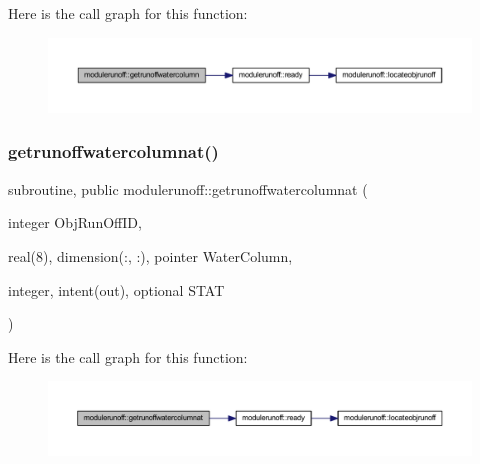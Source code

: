 Here is the call graph for this function\+:
\nopagebreak
\begin{figure}[H]
\begin{center}
\leavevmode
\includegraphics[width=350pt]{namespacemodulerunoff_a2f62616fa000a8f027d3557454de9b24_cgraph}
\end{center}
\end{figure}
\mbox{\label{namespacemodulerunoff_a6f2a352071be64f678c58f0707749d4f}} 
\subsubsection{\texorpdfstring{getrunoffwatercolumnat()}{getrunoffwatercolumnat()}}
{\footnotesize\ttfamily subroutine, public modulerunoff\+::getrunoffwatercolumnat (\begin{DoxyParamCaption}\item[{integer}]{Obj\+Run\+Off\+ID,  }\item[{real(8), dimension(\+:, \+:), pointer}]{Water\+Column,  }\item[{integer, intent(out), optional}]{S\+T\+AT }\end{DoxyParamCaption})}

Here is the call graph for this function\+:
\nopagebreak
\begin{figure}[H]
\begin{center}
\leavevmode
\includegraphics[width=350pt]{namespacemodulerunoff_a6f2a352071be64f678c58f0707749d4f_cgraph}
\end{center}
\end{figure}
\mbox{\label{namespacemodulerunoff_a4718c4b469bb2480c20b88afa22ebc29}} 
